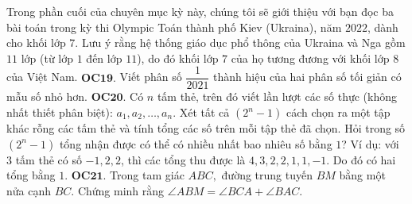\begin{multicols}{2}
\begin{figure}[H]
		\vspace*{-10pt}
	\end{figure}
	Trong phần cuối của chuyên mục kỳ này, chúng tôi sẽ giới thiệu với bạn đọc ba bài toán trong kỳ thi Olympic Toán thành phố Kiev (Ukraina), năm $2022$, dành cho khối lớp $7$. Lưu ý rằng hệ thống giáo dục phổ thông của Ukraina và Nga gồm $11$ lớp (từ lớp $1$ đến lớp $11$), do đó khối lớp $7$ của họ tương đương với khối lớp $8$ của Việt Nam.
	\vskip 0.1cm
	{\bf\color{cackithi} OC$\pmb{19.}$}  Viết phân số $\dfrac{1}{2021}$ thành hiệu của hai phân số tối giản có mẫu số nhỏ hơn.
	\vskip 0.1cm
	{\bf\color{cackithi} OC$\pmb{20.}$} Có $n$ tấm thẻ, trên đó viết lần lượt các số thực (không nhất thiết phân biệt): $a_1, a_2, \ldots, a_n$.  Xét tất cả $ (2^n-1) $ cách chọn ra một tập khác rỗng các tấm thẻ và tính tổng các số trên mỗi tập thẻ đã chọn. Hỏi trong số $(2^n-1)$ tổng nhận được có thể có nhiều nhất bao nhiêu số bằng $1$?
	\vskip 0.1cm
	Ví dụ: với $3$ tấm thẻ có số $-1, 2, 2$, thì các tổng thu được là $4, 3, 2, 2, 1, 1, -1.$ Do đó có hai tổng bằng $1$.
	\vskip 0.1cm
	{\bf\color{cackithi} OC$\pmb{21.}$} Trong tam giác $ ABC,$ đường trung tuyến $BM $ bằng một nửa cạnh $ BC $. Chứng minh rằng $ \angle ABM = \angle BCA + \angle BAC .$
\end{multicols}